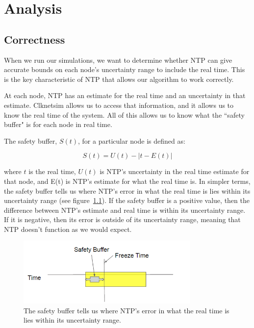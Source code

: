 \chapter{Analysis}
\label{sec:analysis}

\section{Correctness}

When we run our simulations, we want to determine whether NTP can give
accurate bounds on each node's uncertainty range to include the real
time. This is the key characteristic of NTP that allows our algorithm
to work correctly.

At each node, NTP has an estimate for the real time and an uncertainty
in that estimate. Clknetsim allows us to access that information, and
it allows us to know the real time of the system. All of this allows
us to know what the ``safety buffer" is for each node in real time.

The safety buffer, $S(t)$,  for a particular node is defined as:

\[ S(t) = U(t) - | t - E(t)| \]

where $t$ is the real time, $U(t)$ is NTP's uncertainty in the real
time estimate for that node, and E(t) is NTP's estimate for what the
real time is. In simpler terms, the safety buffer tells us where NTP's
error in what the real time is lies within its uncertainty range (see
figure~\ref{fig:safety-diag}). If the safety buffer is a positive
value, then the difference between NTP's estimate and real time is
within its uncertainty range. If it is negative, then its error is
outside of its uncertainty range, meaning that NTP doesn't function as
we would expect.

\begin{figure}[h]
  \caption{The safety buffer tells us where NTP's error in what the real time is lies within its uncertainty range.} 
  \label{fig:safety-diag}
  \centering
  \includegraphics[width=0.8\textwidth]{safety-diagram.png}
\end{figure}

